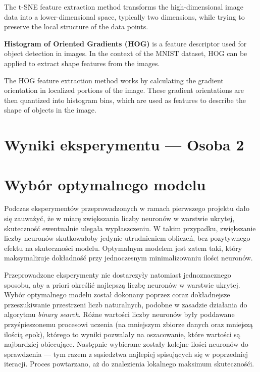 \documentclass[12pt]{article}
\begin{document}
    The t-SNE feature extraction method transforms the high-dimensional image data into a lower-dimensional space, typically two dimensions, while trying to preserve the local structure of the data points.

    \textbf{Histogram of Oriented Gradients (HOG)} is a feature descriptor used for object detection in images. In the context of the MNIST dataset, HOG can be applied to extract shape features from the images.

    The HOG feature extraction method works by calculating the gradient orientation in localized portions of the image. These gradient orientations are then quantized into histogram bins, which are used as features to describe the shape of objects in the image.

    \pagebreak

    \section{Wyniki eksperymentu --- Osoba 2}
    \pagebreak

    \section{Wybór optymalnego modelu}

    Podczas eksperymentów przeprowadzonych w ramach pierwszego projektu dało się zauważyć, że w miarę zwiększania
    liczby neuronów w warstwie ukrytej, skuteczność ewentualnie ulegała wypłaszczeniu.
    W takim przypadku, zwiększanie liczby neuronów skutkowałoby jedynie utrudnieniem obliczeń, bez pozytywnego efektu na skuteczności modelu.
    Optymalnym modelem jest zatem taki, który maksymalizuje dokładność przy jednoczesnym minimalizowaniu ilości neuronów.

    Przeprowadzone eksperymenty nie dostarczyły natomiast jednoznacznego sposobu, aby a priori określić najlepszą liczbę neuronów w warstwie ukrytej.
    Wybór optymalnego modelu został dokonany poprzez coraz dokładnejsze przeszukiwanie przestrzeni liczb naturalnych, podobne w zasadzie działania do algorytmu \emph{binary search}.
    Różne wartości liczby neuronów były poddawane przyśpieszonemu procesowi uczenia (na mniejszym zbiorze danych oraz mniejszą ilością epok), którego to wyniki pozwalały na oszacowanie, które wartości są najbardziej obiecujące.
    Następnie wybierane zostały kolejne ilości neuronów do sprawdzenia --- tym razem z sąsiedztwa najlepiej spisujących się w poprzedniej iteracji.
    Proces powtarzano, aż do znalezienia lokalnego maksimum skutecznośći.
\end{document}
